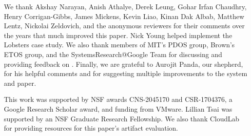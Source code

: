 
We thank Akshay Narayan, Anish Athalye, Derek Leung, Gohar Irfan Chaudhry, Henry
Corrigan-Gibbs, James Mickens, Kevin Liao, Kinan Dak Albab, Matthew Lentz,
Nickolai Zeldovich, and the anonymous reviewers for their comments over the
years that much improved this paper. Nick Young helped implement the Lobsters
case study. We also thank members of MIT's PDOS group, Brown's ETOS group, and
the SystemsResearch@Google Team for discussing and providing feedback on \sys.
%
Finally, we are grateful to Aurojit Panda, our shepherd, for his helpful comments and
for suggesting multiple improvements to the system and paper.
%

%
This work was supported by NSF awards CNS-2045170 and CSR-1704376, a Google Research Scholar award,
and funding from VMware.
%
Lillian Tsai was supported by an NSF Graduate Research Fellowship.
%
We also thank CloudLab~\cite{cloudlab} for providing resources for this paper's
artifact evaluation.
